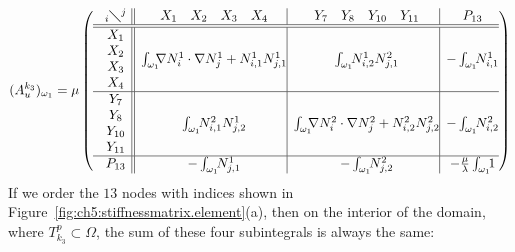 \begin{equation*}
(A_u^{k_3})_{\omega_1} =
\mu \left( \begin{array}{c@{}|*{3}{|c@{}}}
{}_i\diagdown^j &
\begin{array}{*{4}{c}} X_1 & X_2 & X_3 & X_4 \end{array} &
\begin{array}{*{4}{c}} Y_7 & Y_8 & Y_{10} & Y_{11} \end{array} &
P_{13} \\
\hline\hline
\begin{array}{c} X_1 \\ X_2 \\ X_3 \\ X_4 \end{array} &
\int_{\omega_1} \!\!\! \nabla N^1_i \cdot \nabla N^1_j + N^1_{i,1} N^1_{j,1} &
\int_{\omega_1} \!\! N^1_{i,2} N^2_{j,1} &
-\int_{\omega_1} \!\! N^1_{i,1} \\
\hline
\begin{array}{c} Y_7 \\ Y_8 \\ Y_{10} \\ Y_{11} \end{array} &
\int_{\omega_1} \!\! N^2_{i,1} N^1_{j,2} &
\int_{\omega_1} \!\!\! \nabla N^2_i \cdot \nabla N^2_j + N^2_{i,2} N^2_{j,2} &
-\int_{\omega_1} \!\! N^2_{i,2} \\
\hline
P_{13} &
-\int_{\omega_1} \!\! N^1_{j,1} &
-\int_{\omega_1} \!\! N^2_{j,2} &
-\frac{\mu}{\lambda} \int_{\omega_1} \!\! 1
\end{array} \right)
\end{equation*}
If we order the $13$ nodes with indices shown in Figure~\ref{fig:ch5:stiffnessmatrix.element}(a), then on the interior of the domain, where $T^p_{k_3} \subset \Omega$, the sum of these four subintegrals is always the same:
